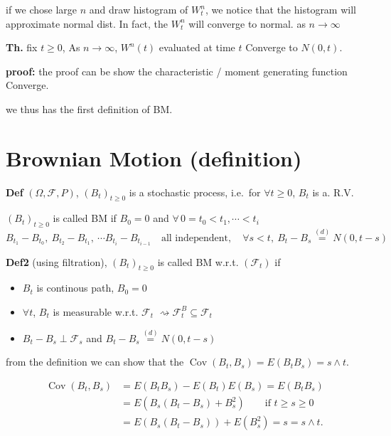 \documentclass[
  letterpaper,
  DIV=11,
  numbers=noendperiod]{scrreprt}
\providecommand{\tightlist}{%
  \setlength{\itemsep}{0pt}\setlength{\parskip}{0pt}}
\theoremstyle{definition}
\theoremstyle{plain}
\theoremstyle{plain}
\theoremstyle{definition}
\theoremstyle{plain}
\theoremstyle{plain}
\theoremstyle{remark}
\begin{document}
if we chose large \(n\) and draw histogram of \(W^n_t\), we notice that
the histogram will approximate normal dist. In fact, the \(W^n_t\) will
converge to normal. as \(n \to \infty\)

\textbf{Th.} fix \(t \geq 0\), As \(n \to \infty\), \(W^n(t)\) evaluated
at time \(t\) Converge to \(N(0, t)\).

\textbf{proof:} the proof can be show the characteristic / moment
generating function Converge.

we thus has the first definition of BM.

\section{Brownian Motion (definition)}\label{brownian-motion-definition}

\textbf{Def} \((\Omega, \mathcal{F}, P)\), \((B_t)_{t \geq 0}\) is a
stochastic process, i.e.~for \(\forall t \geq 0\), \(B_t\) is a. R.V.

\((B_t)_{t \geq 0}\) is called BM if \(B_0 = 0\) and
\(\forall\, 0 = t_0 < t_1, \cdots < t_i\) \[
B_{t_1} - B_{t_0}, \ B_{t_2} - B_{t_1}, \ \cdots B_{t_i} - B_{t_{i-1}} \quad \text{all independent}, \quad \forall s < t, \ B_t - B_s \overset{(d)}{=} N(0, t-s)
\]

\textbf{Def2} (using filtration), \((B_t)_{t \geq 0}\) is called BM
w.r.t. \((\mathcal{F}_t)\) if

\begin{itemize}
\tightlist
\item
  \(B_t\) is continous path, \(B_0 = 0\)
\item
  \(\forall t\), \(B_t\) is measurable w.r.t. \(\mathcal{F}_t\)
  \(\rightsquigarrow \mathcal{F}_t^B \subseteq \mathcal{F}_t\)
\item
  \(B_t - B_s \perp \mathcal{F}_s\) and
  \(B_t - B_s \overset{(d)}{=} N(0, t-s)\)
\end{itemize}

from the definition we can show that the
\(\operatorname{Cov}(B_t, B_s) = E(B_t B_s) = s \wedge t\).

\[
\begin{aligned}
\operatorname{Cov}(B_t, B_s) &= E(B_t B_s) - E(B_t)E(B_s) = E(B_t B_s) \\
&= E(B_s(B_t - B_s) + B_s^2) \qquad \text{if } t \geq s \geq 0 \\
&= E(B_s(B_t - B_s)) + E(B_s^2) = s = s \wedge t.
\end{aligned}
\]
\end{document}
